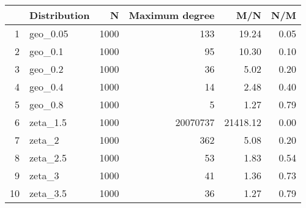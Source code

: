 \begin{table}[ht]
\centering
\begin{tabular}{rlrrrr}
  \hline
 & Distribution & N & Maximum degree & M/N & N/M \\ 
  \hline
1 & geo\_0.05 & 1000 & 133 & 19.24 & 0.05 \\ 
  2 & geo\_0.1 & 1000 &  95 & 10.30 & 0.10 \\ 
  3 & geo\_0.2 & 1000 &  36 & 5.02 & 0.20 \\ 
  4 & geo\_0.4 & 1000 &  14 & 2.48 & 0.40 \\ 
  5 & geo\_0.8 & 1000 &   5 & 1.27 & 0.79 \\ 
  6 & zeta\_1.5 & 1000 & 20070737 & 21418.12 & 0.00 \\ 
  7 & zeta\_2 & 1000 & 362 & 5.08 & 0.20 \\ 
  8 & zeta\_2.5 & 1000 &  53 & 1.83 & 0.54 \\ 
  9 & zeta\_3 & 1000 &  41 & 1.36 & 0.73 \\ 
  10 & zeta\_3.5 & 1000 &  36 & 1.27 & 0.79 \\ 
   \hline
\end{tabular}
\end{table}
